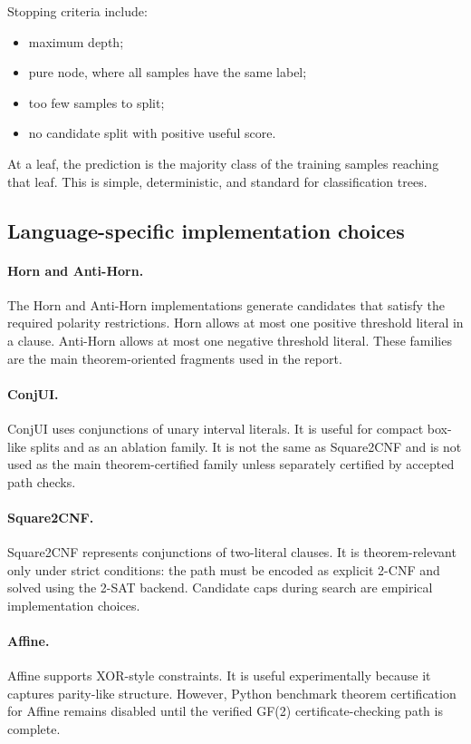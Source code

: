 \documentclass[11pt,a4paper]{article}
\begin{document}
Stopping criteria include:
\begin{itemize}
    \item maximum depth;
    \item pure node, where all samples have the same label;
    \item too few samples to split;
    \item no candidate split with positive useful score.
\end{itemize}

At a leaf, the prediction is the majority class of the training samples reaching that leaf. This is simple, deterministic, and standard for classification trees.

\subsection{Language-specific implementation choices}

\paragraph{Horn and Anti-Horn.}
The Horn and Anti-Horn implementations generate candidates that satisfy the required polarity restrictions. Horn allows at most one positive threshold literal in a clause. Anti-Horn allows at most one negative threshold literal. These families are the main theorem-oriented fragments used in the report.

\paragraph{ConjUI.}
ConjUI uses conjunctions of unary interval literals. It is useful for compact box-like splits and as an ablation family. It is not the same as Square2CNF and is not used as the main theorem-certified family unless separately certified by accepted path checks.

\paragraph{Square2CNF.}
Square2CNF represents conjunctions of two-literal clauses. It is theorem-relevant only under strict conditions: the path must be encoded as explicit 2-CNF and solved using the 2-SAT backend. Candidate caps during search are empirical implementation choices.

\paragraph{Affine.}
Affine supports XOR-style constraints. It is useful experimentally because it captures parity-like structure. However, Python benchmark theorem certification for Affine remains disabled until the verified GF(2) certificate-checking path is complete.
\end{document}
